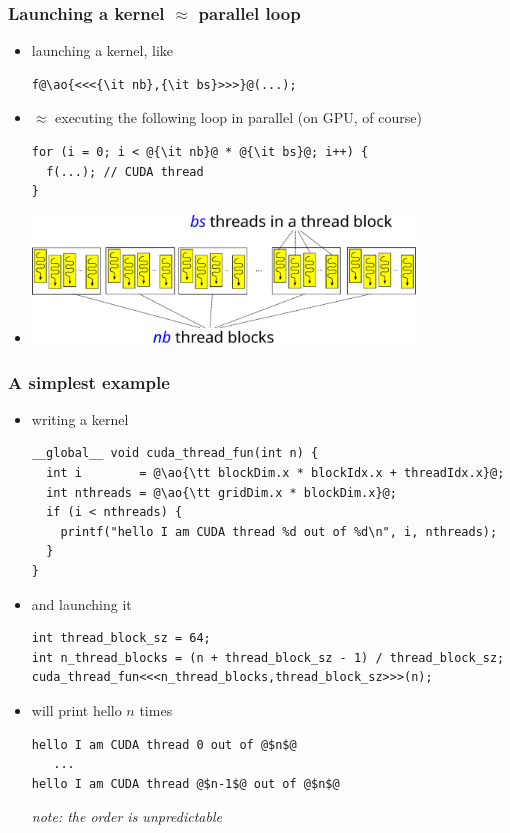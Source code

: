 \documentclass[12pt,dvipdfmx]{beamer}
\newcommand{\ao}[1]{{\color{blue}#1}}
\begin{document}
\begin{frame}[fragile]
  \frametitle{Launching a kernel $\approx$ parallel loop}
\begin{itemize}
  \item launching a kernel, like
\begin{lstlisting}
f@\ao{<<<{\it nb},{\it bs}>>>}@(...);
\end{lstlisting}

\item $\approx$ executing the following loop in parallel
  (on GPU, of course)
\begin{lstlisting}
for (i = 0; i < @{\it nb}@ * @{\it bs}@; i++) {
  f(...); // CUDA thread
}
\end{lstlisting}

\item []

  \begin{center}
    \includegraphics[width=0.8\textwidth]{out/pdf/svg/thread_blocks_1.pdf}
  \end{center}
\end{itemize}
\end{frame}

\begin{frame}[fragile]
\frametitle{A simplest example}
\begin{itemize}
\item [] writing a kernel
\begin{lstlisting}
__global__ void cuda_thread_fun(int n) {
  int i        = @\ao{\tt blockDim.x * blockIdx.x + threadIdx.x}@;
  int nthreads = @\ao{\tt gridDim.x * blockDim.x}@;
  if (i < nthreads) {
    printf("hello I am CUDA thread %d out of %d\n", i, nthreads);
  }
}
\end{lstlisting}

\item [] and launching it
\begin{lstlisting}
int thread_block_sz = 64;
int n_thread_blocks = (n + thread_block_sz - 1) / thread_block_sz;
cuda_thread_fun<<<n_thread_blocks,thread_block_sz>>>(n);
\end{lstlisting}

\item [] will print hello $n$ times
\begin{lstlisting}
hello I am CUDA thread 0 out of @$n$@
   ...
hello I am CUDA thread @$n-1$@ out of @$n$@
\end{lstlisting}
{\it note: the order is unpredictable}
\end{itemize}
\end{frame}
\end{document}
